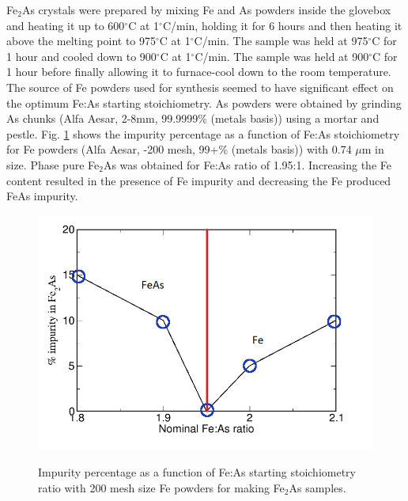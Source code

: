 \documentclass[10pt,doublespacing,edeposit]{uiucthesis2020}
\begin{document}
\begin{mainmatter}
Fe$_2$As crystals were prepared by mixing Fe and As powders inside the glovebox and heating it up to 600$^\circ$C at 1$^\circ$C/min, holding it for 6 hours and then heating it above the melting point to 975$^\circ$C at 1$^\circ$C/min. The sample was held at 975$^\circ$C for 1 hour and cooled down to 900$^\circ$C at 1$^\circ$C/min. The sample was held at 900$^\circ$C for 1 hour before finally allowing it to furnace-cool down to the room temperature. The source of Fe powders used for synthesis seemed to have significant effect on the optimum Fe:As starting stoichiometry. As powders were obtained by grinding As chunks (Alfa Aesar, 2-8mm, 99.9999\% (metals basis)) using a mortar and pestle. Fig. \ref{fig:Fe2As_ratio_1} shows the impurity percentage as a function of Fe:As stoichiometry for Fe powders (Alfa Aesar, -200 mesh, 99+\% (metals basis)) with 0.74 $\mu$m in size. Phase pure Fe$_2$As was obtained for Fe:As ratio of 1.95:1. Increasing the Fe content resulted in the presence of Fe impurity and decreasing the Fe produced FeAs impurity.

\begin{figure}
\centering\includegraphics[width=0.5\columnwidth]{figures/ch3/Fe2As_ratio_1.png} \\
\caption{\label{fig:Fe2As_ratio_1}
Impurity percentage as a function of Fe:As starting stoichiometry ratio with 200 mesh size Fe powders for making Fe$_2$As samples.
}
\end{figure}


\end{mainmatter}
\end{document}
